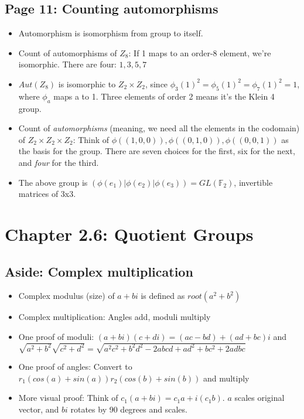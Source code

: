 \documentclass[11pt, oneside]{article}   	%
\begin{document}
\subsection{Page 11: Counting automorphisms}
\begin{itemize}
\item Automorphism is isomorphism from group to itself.
\item Count of automorphisms of $Z_8$: If 1 maps to an order-8 element, we're isomorphic.  There are four: ${1,3,5,7}$
\item $Aut(Z_8)$ is isomorphic to $Z_2 \times Z_2$, since $\phi_3(1)^2 = \phi_5(1)^2 = \phi_7(1)^2 = 1$, where $\phi_a$ maps a to 1.  Three elements of order 2 means it's the Klein 4 group.
\item Count of \emph{automorphisms} (meaning, we need all the elements in the codomain) of $Z_2 \times Z_2 \times Z_2$: Think of $\phi((1,0,0)), \phi((0,1,0)), \phi((0,0,1))$ as the basis for the group.  There are seven choices for the first, six for the next, and \emph{four} for the third.  
\item The above group is $(\phi(e_1) | \phi(e_2) | \phi(e_3)) = GL(\mathbb{F}_2)$, invertible matrices of 3x3.
\end{itemize}


\section {Chapter 2.6: Quotient Groups}
\subsection{Aside: Complex multiplication}
\begin{itemize}
\item Complex modulus (size) of $a+bi$ is defined as $root(a^2+b^2)$
\item Complex multiplication: Angles add, moduli multiply
\item One proof of moduli: $(a+bi)(c+di) = (ac - bd) + (ad+bc)i$
and $\sqrt{a^2+b^2}\sqrt{c^2+d^2} = \sqrt{a^2c^2 + b^2d^2 - 2abcd + ad^2+bc^2 + 2adbc}$
\item One proof of angles: Convert to $r_1(cos(a) + sin(a))r_2(cos(b)+sin(b))$ and multiply
\item More visual proof: Think of $c_1(a+bi) = c_1a + i(c_1b)$. $a$ scales original vector, and $bi$ rotates by 90 degrees and scales.
\end{itemize}
\end{document}
